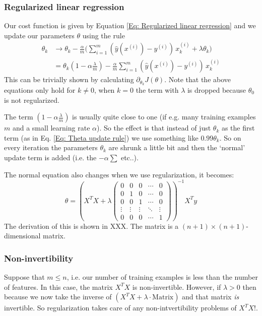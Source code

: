 \documentclass[a4paper, 10pt,hidelinks]{article}
\newcommand{\ind}[1]{^{(#1)}}
\begin{document}
\subsubsection{Regularized linear regression}

Our cost function is given by Equation \eqref{Eq: Regularized linear regression} and we update our parameters $\theta$ using the rule
\begin{align}
\theta_k &\rightarrow \theta_k - \frac{\alpha}{m} \Bigg( \sum_{i = 1}^m (\hat{y}(x\ind{i}) - y\ind{i}) \, x_k\ind{i} + \lambda \theta_{k} \Bigg) \nonumber \\
&= \theta_k \left(1 - \alpha \frac{\lambda}{m}\right) - \frac{\alpha}{m} \sum_{i = 1}^m (\hat{y}(x\ind{i}) - y\ind{i}) \, x_k\ind{i} \label{Eq: Regularized theta update}
\end{align}
This can be trivially shown by calculating $\partial_{\theta_k} J(\theta)$. Note that the above equations only hold for $k \neq 0$, when $k =0$ the term with $\lambda$ is dropped because $\theta_0$ is not regularized. 

The term $\left( 1 - \alpha \frac{\lambda}{m} \right)$ is usually quite close to one (if e.g. many training examples $m$ and a small learning rate $\alpha$). So the effect is that instead of just $\theta_k$ as the first term (as in Eq. \eqref{Eq: Theta update rule}) we use something like $0.99 \theta_k$. So on every iteration the parameters $\theta_k$ are shrunk a little bit and then the `normal' update term is added (i.e. the $- \alpha \sum$ etc..).

The normal equation also changes when we use regularization, it becomes:
\begin{equation}
\theta = \left( X^T X + \lambda \begin{pmatrix}
0 & 0 & 0 & \cdots & 0 \\
0 & 1 & 0 & \cdots & 0 \\
0 & 0 & 1 & \cdots & 0 \\
\vdots & \vdots & \vdots  & \ddots & \vdots \\
0 & 0 & 0 & \cdots & 1
\end{pmatrix} \right)^{-1} X^T y
\end{equation}
The derivation of this is shown in XXX. The matrix is a $(n + 1) \times (n + 1)$-dimensional matrix.

\subsubsection{Non-invertibility}\label{Sec: Regularization and invertibility}
Suppose that $m \leq n$, i.e. our number of training examples is less than the number of features. In this case, the matrix $X^T X$ is non-invertible. However, if $\lambda > 0$ then because we now take the inverse of $(X^T X + \lambda \cdot \text{Matrix})$ and that matrix \emph{is} invertible. So regularization takes care of any non-intvertibility problems of $X^T X$!.
\end{document}
